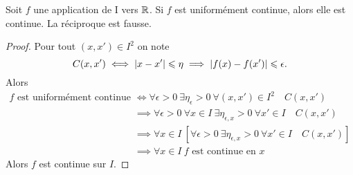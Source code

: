 \begin{theo}
  Soit \(f\) une application de I vers \(\mathbb{R}\). Si \(f\) est uniformément continue, alors elle est continue. La réciproque est fausse.
\end{theo}
\begin{proof}
  Pour tout \((x,x') \in I^2\) on note
  \begin{equation}
    C(x,x') \iff \left\lvert x-x'\right\rvert \leqslant \eta \implies \left\lvert f(x)-f(x')\right\rvert \leqslant \epsilon.
  \end{equation}
  Alors
  \begin{align}
    f \text{~est uniformément continue} &\iff \forall \epsilon > 0 \ \exists \eta_{\epsilon} > 0 \ \forall (x,x') \in I^2 \quad C(x,x')\\
    &\implies \forall \epsilon > 0 \ \forall x \in I \ \exists \eta_{\epsilon, x} > 0 \ \forall x' \in I \quad C(x,x')\\
    &\implies \forall x \in I \ \left[\forall \epsilon > 0 \ \exists \eta_{\epsilon, x} > 0 \ \forall x' \in I \quad C(x,x')\right]\\
    &\implies \forall x \in I \ f \text{~est continue en } x 
  \end{align}
Alors \(f\) est continue sur \(I\).
\end{proof}

